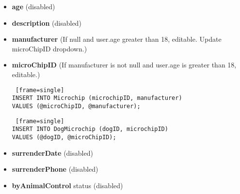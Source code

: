 \documentclass{article}
\begin{document}
\begin{itemize}
\begin{itemize}
        \begin{Verbatim} [frame=single]
UPDATE Dog d
SET altered = @altered
WHERE altered = FALSE AND d.dogID = @dogID;
        \end{Verbatim}
        \item \textbf{age} (disabled)
        \item \textbf{description} (disabled)
        \item \textbf{manufacturer} (If null and user.age greater than 18, editable. Update microChipID dropdown.)
        \item \textbf{microChipID} (If manufacturer is not null and user.age is greater than 18, editable.)
        \begin{Verbatim} [frame=single]
INSERT INTO Microchip (microchipID, manufacturer)
VALUES (@microChipID, @manufacturer);
        \end{Verbatim}
        \begin{Verbatim} [frame=single]
INSERT INTO DogMicrochip (dogID, microchipID)
VALUES (@dogID, @microChipID);
        \end{Verbatim}
        \item \textbf{surrenderDate} (disabled)
        \item \textbf{surrenderPhone} (disabled)
        \item \textbf{byAnimalControl} status (disabled)
    \end{itemize}
\end{itemize}
\end{document}
